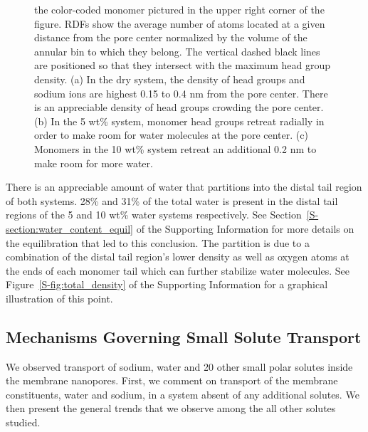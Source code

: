 \documentclass[journal=jpcbfk,manuscript=article]{achemso}
\begin{document}
\begin{figure}[!htb]
{  the color-coded monomer pictured in the upper right corner of the figure. 
  RDFs show the average number of atoms located at a given distance from the
  pore center normalized by the volume of the annular bin to which they belong.
  The vertical dashed black lines are positioned so that they intersect with 
  the maximum head group density.
  (a) In the dry system, the density of head groups and sodium ions are highest
  0.15 to 0.4 nm from the pore center. There is an appreciable density of head groups
  crowding the pore center. (b) In the 5 wt\% system, monomer head 
  groups retreat radially in order to make room for water molecules at the pore center.
  (c) Monomers in the 10 wt\% system retreat an additional 0.2 nm to make room
  for more water.}\label{fig:component_densities}
  \end{figure}
  

  There is an appreciable amount of water that partitions into the distal tail %
  region of both systems. 28\% and 31\% of the total water is present in the
  distal tail regions of the 5 and 10 wt\% water systems respectively. See 
  Section~\ref{S-section:water_content_equil} of the Supporting Information 
  for more details on the equilibration that led to this conclusion. The partition
  is due to a combination of the distal tail region's lower density as well
  as oxygen atoms at the ends of each monomer tail which can further stabilize
  water molecules. See Figure~\ref{S-fig:total_density} of the Supporting 
  Information for a graphical illustration of this point.

  \subsection{Mechanisms Governing Small Solute Transport}\label{section:mechanism_overview} 

  We observed transport of sodium, water and 20 other small polar solutes
  inside the membrane nanopores. First, we comment on transport of the
  membrane constituents, water and sodium, in a system absent of any additional
  solutes. We then present the general trends that we observe among the
  all other solutes studied.
  
\end{document}
